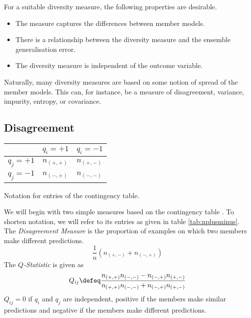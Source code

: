 \documentclass[../main.tex]{subfiles}
\begin{document}

For a suitable diversity measure, the following properties are desirable.
\begin{itemize}
  \item The measure captures the differences between member models.
  \item There is a relationship between the diversity measure and the ensemble generalisation error.
  \item The diversity measure is independent of the outcome variable.
\end{itemize}

Naturally, many diversity measures are based on some notion of spread of the member models. This can, for instance, be a measure of disagreement, variance, impurity, entropy, or covariance.

\subsection{Disagreement}
\begin{margintable}
    \centering
    \begin{tabular}{|l|l|l|}
    \hline
         & $q_i = +1$ & $q_i = -1$ \\ \hline
        $q_j = +1$ & $n_{(+,+)}$ & $n_{(+,-)}$ \\ \hline
        $q_j = -1$ & $n_{(-,+)}$ & $n_{(-,-)}$ \\ \hline
    \end{tabular}
    \caption{Notation for entries of the contingency table.}
    \label{tab:nplusminus}
\end{margintable}
We will begin with two simple measures based on the contingency table \cite{zhou_EnsembleMethodsFoundations_2012}. To shorten notation, we will refer to its entries as given in table \ref{tab:nplusminus}.
The \textit{Disagreement Measure} is the proportion of examples on which two members make different predictions.
$$
\frac{1}{n} (n_{(+,-)} + n_{(-,+)})
$$
The \textit{$Q$-Statistic} is given as
$$
Q_{ij}\defeq \frac{n_{(+,+)} n_{(-,-)} - n_{(-,+)} n_{(+,-)}}{n_{(+,+)} n_{(-,-)} + n_{(-,+)} n_{(+,-)}}
$$
$Q_{ij} = 0$ if $q_{i}$ and $q_{j}$ are independent, positive if the members make similar predictions and negative if the members make different predictions.
\end{document}
